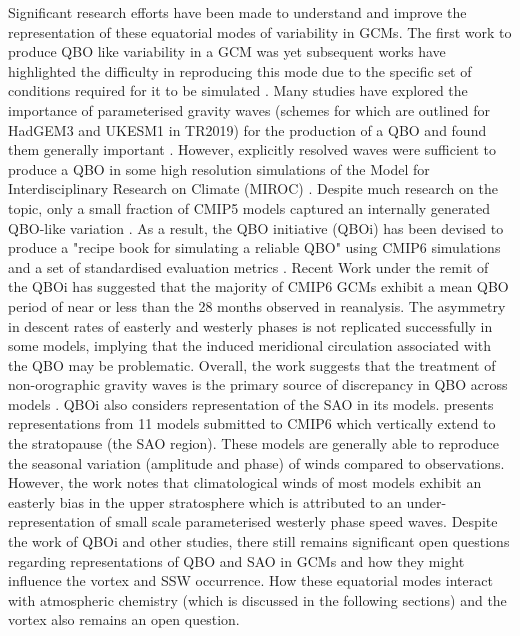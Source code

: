 Significant research efforts have been made to understand and improve the representation of these equatorial modes of variability in GCMs. The first work to produce QBO like variability in a GCM was \cite{Takahashi1996} yet subsequent works have highlighted the difficulty in reproducing this mode due to the specific set of conditions required for it to be simulated \citep{Baldwin2001}. Many studies have explored the importance of parameterised gravity waves (schemes for which are outlined for HadGEM3 and UKESM1 in TR2019) for the production of a QBO and found them generally important \citep{Giorgetta2006,Osprey2010}. However, explicitly resolved waves were sufficient to produce a QBO in some high resolution simulations of the Model for Interdisciplinary Research on Climate (MIROC) \citep{Kawatani2011}. Despite much research on the topic, only a small fraction of CMIP5 models captured an internally generated QBO-like variation \citep{Charlton-Perez2013}. As a result, the QBO initiative (QBOi) has been devised to produce a "recipe book for simulating a reliable QBO" using CMIP6 simulations and a set of standardised evaluation metrics \citep{Butchart2018}. Recent Work under the remit of the QBOi \citep{Bushall} has suggested that the majority of CMIP6 GCMs exhibit a mean QBO period of near or less than the 28 months observed in reanalysis. The asymmetry in descent rates of easterly and westerly phases is not replicated successfully in some models, implying that the induced meridional circulation associated with the QBO may be problematic. Overall, the work suggests that the treatment of non-orographic gravity waves is the primary source of discrepancy in QBO across models \citep{Bushall}. QBOi also considers representation of the SAO in its models. \cite{Smith20} presents representations from 11 models submitted to CMIP6 which vertically extend to the stratopause (the SAO region). These models are generally able to reproduce the seasonal variation (amplitude and phase) of winds compared to observations. However, the work notes that climatological winds of most models exhibit an easterly bias in the upper stratosphere which is attributed to an under-representation of small scale parameterised westerly phase speed waves. Despite the work of QBOi and other studies, there still remains significant open questions regarding representations of QBO and SAO in GCMs and how they might influence the vortex and SSW occurrence. How these equatorial modes interact with atmospheric chemistry (which is discussed in the following sections) and the vortex also remains an open question. 

